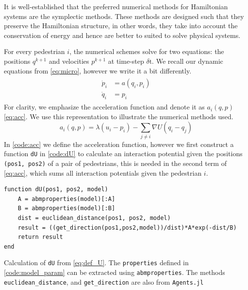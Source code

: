It is well-established that the preferred numerical methods for Hamiltonian systems are the symplectic methods. These methods are designed such that they preserve the Hamiltonian structure, in other words, they take into account the conservation of energy and hence are better to suited to solve physical systems.

For every pedestrian $i$, the numerical schemes solve for two equations: the positions $q^{k+1}$ and velocities $p^{k+1}$ at time-step $\delta \text{t}$. We recall our dynamic equations from \autoref{eq:micro}, however we write it a bit differently.
\begin{gather}
    \begin{aligned}
    \dot p_i &= a(q_i,p_i) \\
    \dot q_i &= p_i
    \end{aligned}
    \label{eq:diff_pq}
\end{gather}
For clarity, we emphasize the acceleration function and denote it as $a_i(q,p)$ \autoref{eq:acc}. We use this representation to illustrate the numerical methods used.
\begin{equation}
    a_i(q,p) = \lambda(u_i - p_i) - \sum_{j \neq i} \nabla U(q_i - q_j)
    \label{eq:acc}
\end{equation}
In \autoref{code:acc} we define the acceleration function, however we first construct a function \texttt{dU} in \autoref{code:dU} to calculate an interaction potential given the positions \texttt{(pos1, pos2)} of a pair of pedestrians, this is needed in the second term of \autoref{eq:acc}, which sums all interaction potentials given the pedestrian $i$.
\begin{listing}[H]
\begin{verbatim}
function dU(pos1, pos2, model)
    A = abmproperties(model)[:A]
    B = abmproperties(model)[:B]
    dist = euclidean_distance(pos1, pos2, model)
    result = ((get_direction(pos1,pos2,model))/dist)*A*exp(-dist/B)
    return result
end
\end{verbatim}
\caption{Calculation of \texttt{dU} from \autoref{eq:def_U}. The \texttt{properties} defined in \autoref{code:model_param} can be extracted using \texttt{abmproperties}. The methods \texttt{euclidean\_distance}, and \texttt{get\_direction} are also from \texttt{Agents.jl}}
\label{code:dU}
\end{listing}

